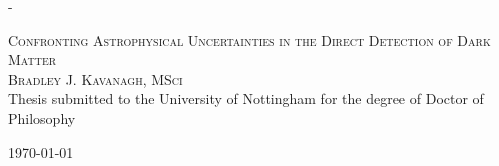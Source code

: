 \calccentering{\unitlength}                         %
\begin{adjustwidth*}{\unitlength}{-\unitlength}     %
    \begin{adjustwidth}{-1cm}{-1cm}                 %
      \begin{titlingpage}
      \begin{center}


      \textsc{\LARGE Confronting Astrophysical Uncertainties in the Direct Detection of Dark Matter}\\[1.5cm]

      \textsc{\Large Bradley J. Kavanagh, MSci}\\[0.5cm]


      Thesis submitted to the University of Nottingham for the degree of Doctor of Philosophy

      \vfill

      {\large \today}

      \end{center}
      \end{titlingpage}
    \end{adjustwidth}
\end{adjustwidth*}
